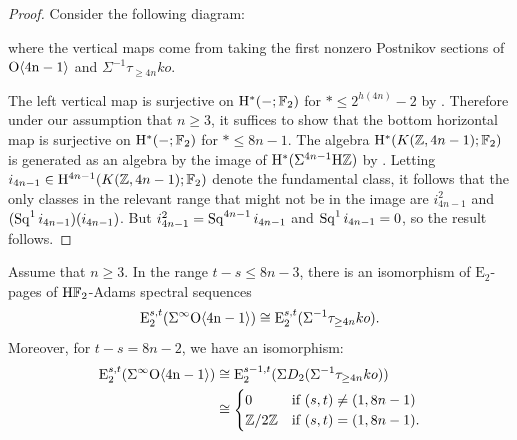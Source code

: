 \begin{proof}
  Consider the following diagram:
  \begin{center}
  \end{center}
  where the vertical maps come from taking the first nonzero Postnikov sections of $\mathrm{O}\mathrm{\langle 4n-1 \rangle}$ and $\Sigma^{-1} \tau_{\geq 4n} ko$.

  The left vertical map is surjective on $\mathrm{H}^* (-; \operatorname{\mathbb{F}}_2)$ for $* \leq 2^{h(4n)} - 2$ by . Therefore under our assumption that $n \geq 3$, it suffices to show that the bottom horizontal map is surjective on $\mathrm{H}^* (-; \operatorname{\mathbb{F}}_2)$ for $* \leq 8n-1$. The algebra $\mathrm{H}^*(K(\mathbb{Z}, 4n-1); \operatorname{\mathbb{F}}_2)$ is generated as an algebra by the image of $\mathrm{H}^* (\Sigma^{4n-1} \mathrm{H}\mathbb{Z})$ by \cite[Th\'{e}or\`{e}me 3]{SerreCohEM}. Letting $i_{4n -1} \in \mathrm{H}^{4n-1} (K(\mathbb{Z},4n-1);\operatorname{\mathbb{F}}_2)$ denote the fundamental class, it follows that the only classes in the relevant range that might not be in the image are $i_{4n-1}^2$ and $(\operatorname{\mathrm{Sq}}^1 i_{4n-1})(i_{4n-1})$. But $i_{4n-1}^2 = \operatorname{\mathrm{Sq}}^{4n-1} i_{4n-1}$ and $\operatorname{\mathrm{Sq}}^1 i_{4n-1} = 0$, so the result follows.
\end{proof}

\begin{prop}\label{prop:E2compute}
  Assume that $n \geq 3$.
  In the range $t-s \leq 8n-3$, there is an isomorphism of $\mathrm{E}_2$-pages of $\mathrm{H}\mathbb{F}_2$-Adams spectral sequences
  \[ \mathrm{E}_2 ^{s,t} (\Sigma^\infty \mathrm{O}\mathrm{\langle 4n-1 \rangle}) \cong \mathrm{E}_2 ^{s,t} (\Sigma^{-1} \tau_{\geq 4n} ko). \]
  Moreover, for $t-s = 8n-2$, we have an isomorphism:
  \begin{align*}
    \mathrm{E}_2 ^{s,t} (\Sigma^\infty \mathrm{O}\mathrm{\langle 4n-1 \rangle}) &\cong \mathrm{E}_2 ^{s-1,t} (\Sigma D_2 (\Sigma^{-1} \tau_{\geq 4n} ko)) \\
    &\cong \begin{cases} 0 & \text{if }(s,t) \neq (1,8n-1) \\ \mathbb{Z}/2\mathbb{Z} & \text{if } (s,t) = (1,8n-1). \end{cases}
  \end{align*}
\end{prop}

